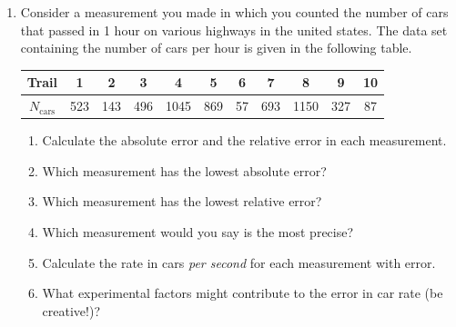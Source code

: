 \begin{enumerate}
  \item Consider a measurement you made in which you counted the number of cars that passed in 1 hour on various highways in the united states. The data set containing the number of cars per hour is given in the following table.
  \begin{center}
    \begin{tabular}{|c | c | c | c | c | c | c | c | c | c | c|}
      \hline
      Trail&1&2&3&4&5&6&7&8&9&10 \\ \hline
      $N_{\text{cars}}$&523&143&496&1045&869&57&693&1150&327&87 \\
      \hline
    \end{tabular}
  \end{center}
  \begin{enumerate}
    \item Calculate the absolute error and the relative error in each measurement.
    \item Which measurement has the lowest absolute error?
    \item Which measurement has the lowest relative error?
    \item Which measurement would you say is the most precise?
    \item Calculate the rate in cars {\it{per second}} for each measurement with error.
    \item What experimental factors might contribute to the error in car rate (be creative!)?
  \end{enumerate}
\end{enumerate}

